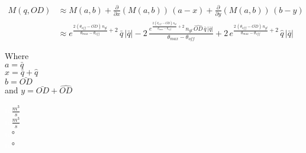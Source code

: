 \begin{equation}
\begin{split}
	M(q,OD) &\approx M(a,b) + \frac{\partial}{\partial x} (M(a,b)) \, (a-x) + \frac{\partial}{\partial y} (M(a,b)) \, (b-y) \\
			&\approx e^{\frac{2 \, (\theta_{off} - \bar{OD}) \, n_{gl}}{\theta_{max}-\theta_{off}}+2} \, \bar{q} \, |\bar{q}| -2 \, \frac{e^{\frac{2 \, (\theta_{off} - \bar{OD}) \, n_{gl}}{\theta_{max}-\theta_{off}}+2} \, n_{gl} \, \hat{OD} \, \bar{q} \, |\bar{q}|}{\theta_{max}-\theta_{off}} + 2 \, e^{\frac{2 \, (\theta_{off} - \bar{OD}) \, n_{gl}}{\theta_{max}-\theta_{off}}+2} \, \hat{q} \, |\bar{q}|
\end{split}
\end{equation}
 \begin{minipage}[t]{0.40\textwidth}
Where\\
\hspace*{8mm} $a=\bar{q}$ \\
\hspace*{8mm} $x=\bar{q}+\hat{q}$ \\
\hspace*{8mm} $b=\bar{OD}$ \\
and \hspace*{0.7mm} $y=\bar{OD}+\hat{OD}$ 
\end{minipage}
\begin{minipage}[t]{0.48\textwidth}
\vspace*{2mm}
\hspace*{8mm}
\hspace*{8mm}
\hspace*{8mm}
\hspace*{8mm}
\end{minipage}
\begin{minipage}[t]{0.10\textwidth}
\vspace*{2mm}
\textcolor{White}{te}$\unit{\frac{m^3}{s}}$\\
\textcolor{White}{te}$\unit{\frac{m^3}{s}}$\\
\textcolor{White}{te}$\unit{\degree}$\\
\textcolor{White}{te}$\unit{\degree}$
\end{minipage}	

